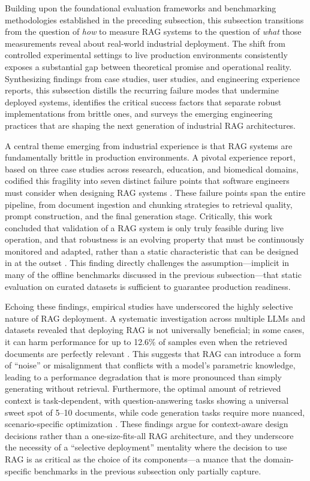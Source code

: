\documentclass[11pt]{article}
\begin{document}
Building upon the foundational evaluation frameworks and benchmarking methodologies established in the preceding subsection, this subsection transitions from the question of \emph{how} to measure RAG systems to the question of \emph{what} those measurements reveal about real-world industrial deployment. The shift from controlled experimental settings to live production environments consistently exposes a substantial gap between theoretical promise and operational reality. Synthesizing findings from case studies, user studies, and engineering experience reports, this subsection distills the recurring failure modes that undermine deployed systems, identifies the critical success factors that separate robust implementations from brittle ones, and surveys the emerging engineering practices that are shaping the next generation of industrial RAG architectures.

A central theme emerging from industrial experience is that RAG systems are fundamentally brittle in production environments. A pivotal experience report, based on three case studies across research, education, and biomedical domains, codified this fragility into seven distinct failure points that software engineers must consider when designing RAG systems \cite{ref572}. These failure points span the entire pipeline, from document ingestion and chunking strategies to retrieval quality, prompt construction, and the final generation stage. Critically, this work concluded that validation of a RAG system is only truly feasible during live operation, and that robustness is an evolving property that must be continuously monitored and adapted, rather than a static characteristic that can be designed in at the outset \cite{ref572}. This finding directly challenges the assumption---implicit in many of the offline benchmarks discussed in the previous subsection---that static evaluation on curated datasets is sufficient to guarantee production readiness.

Echoing these findings, empirical studies have underscored the highly selective nature of RAG deployment. A systematic investigation across multiple LLMs and datasets revealed that deploying RAG is not universally beneficial; in some cases, it can harm performance for up to 12.6\% of samples even when the retrieved documents are perfectly relevant \cite{ref62}. This suggests that RAG can introduce a form of ``noise'' or misalignment that conflicts with a model's parametric knowledge, leading to a performance degradation that is more pronounced than simply generating without retrieval. Furthermore, the optimal amount of retrieved context is task-dependent, with question-answering tasks showing a universal sweet spot of 5--10 documents, while code generation tasks require more nuanced, scenario-specific optimization \cite{ref62}. These findings argue for context-aware design decisions rather than a one-size-fits-all RAG architecture, and they underscore the necessity of a ``selective deployment'' mentality where the decision to use RAG is as critical as the choice of its components---a nuance that the domain-specific benchmarks in the previous subsection only partially capture.
\end{document}
